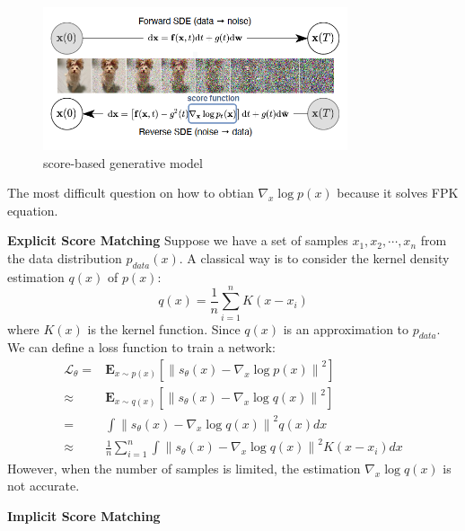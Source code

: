 \begin{figure}[h]
    \centering
    \includegraphics[width=0.8\textwidth]{./pics/score_based.png} %
    \caption{score-based generative model}
\end{figure}


The most difficult question on how to obtian $\nabla_x \log p(x)$ because it solves FPK equation.

\textbf{Explicit Score Matching}
Suppose we have a set of samples $x_1, x_2, \cdots, x_n$ from the data distribution $p_{data}(x)$. 
A classical way is to consider the kernel density estimation $q(x)$ of $p(x)$:
\begin{equation}
    q(x) = \frac{1}{n}\sum_{i=1}^n K(x-x_i)
\end{equation}
where $K(x)$ is the kernel function. Since $q(x)$ is an approximation to $p_{data}$. 
We can define a loss function to train a network:
\begin{equation}
    \begin{aligned}
        \mathcal{L}_\theta =& \mathbf{E}_{x\sim p(x)} \left[\left\|s_\theta(x) - \nabla_x \log p(x)\right\|^2\right]\\
        \approx& \mathbf{E}_{x\sim q(x)} \left[\left\|s_\theta(x) - \nabla_x \log q(x)\right\|^2\right]\\
        =& \int \left\|s_\theta (x) - \nabla_x \log q(x)\right\|^2 q(x) dx\\
        \approx & \frac{1}{n}\sum_{i=1}^n \int \left\|s_\theta (x) - \nabla_x \log q(x)\right\|^2 K(x-x_i) dx
    \end{aligned}
\end{equation}
However, when the number of samples is limited, the estimation $\nabla_x \log q(x)$ is not accurate.

\textbf{Implicit Score Matching}

